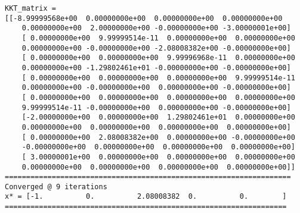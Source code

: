 \documentclass{article}
\begin{document}
\begin{verbatim}
KKT_matrix = 
[[-8.99999568e+00  0.00000000e+00  0.00000000e+00  0.00000000e+00
    0.00000000e+00  2.00000000e+00 -0.00000000e+00 -3.00000001e+00]
    [ 0.00000000e+00  9.99999514e-11  0.00000000e+00  0.00000000e+00
    0.00000000e+00 -0.00000000e+00 -2.08008382e+00 -0.00000000e+00]
    [ 0.00000000e+00  0.00000000e+00  9.99996968e-11  0.00000000e+00
    0.00000000e+00 -1.29802461e+01 -0.00000000e+00 -0.00000000e+00]
    [ 0.00000000e+00  0.00000000e+00  0.00000000e+00  9.99999514e-11
    0.00000000e+00 -0.00000000e+00  0.00000000e+00 -0.00000000e+00]
    [ 0.00000000e+00  0.00000000e+00  0.00000000e+00  0.00000000e+00
    9.99999514e-11 -0.00000000e+00  0.00000000e+00 -0.00000000e+00]
    [-2.00000000e+00  0.00000000e+00  1.29802461e+01  0.00000000e+00
    0.00000000e+00  0.00000000e+00  0.00000000e+00  0.00000000e+00]
    [ 0.00000000e+00  2.08008382e+00  0.00000000e+00 -0.00000000e+00
    -0.00000000e+00  0.00000000e+00  0.00000000e+00  0.00000000e+00]
    [ 3.00000001e+00  0.00000000e+00  0.00000000e+00  0.00000000e+00
    0.00000000e+00  0.00000000e+00  0.00000000e+00  0.00000000e+00]]
===================================================================
Converged @ 9 iterations
x* = [-1.          0.          2.08008382  0.          0.        ]
==================================================================
\end{verbatim}
\end{document}
